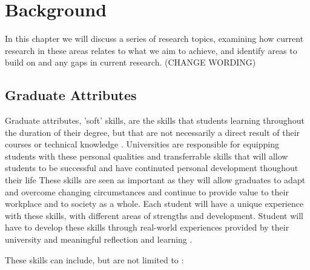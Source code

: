 \documentclass{l4proj}
\begin{document}
\chapter{Background} \label{Background}

In this chapter we will discuss a series of research topics, examining how current research in these areas relates to what we aim to achieve, and identify areas to build on and any gaps in current research. (CHANGE WORDING)

\section{Graduate Attributes}

Graduate attributes, 'soft' skills, are the skills that students learning throughout the duration of their degree, but that are not necessarily a direct result of their courses or technical knowledge \citep{glasgow_university_attributes}. Universities are responsible for equipping students with these personal qualities and transferrable skills that will allow students to be successful and have continuted personal development thoughout their life \citep{stirling_graduate_nodate} These skills are seen as important as they will allow graduates to adapt and overcome changing circumstances and continue to provide value to their workplace and to society as a whole. Each student will have a unique experience with these skills, with different areas of strengths and development. Student will have to develop these skills through real-world experiences provided by their university and meaningful reflection and learning \citep{edinburgh_definition_skills}.

These skills can include, but are not limited to \citep{litchfield_contextualising_2010, stevens_industry_2016, bruno_reflective_2018}:
\end{document}
